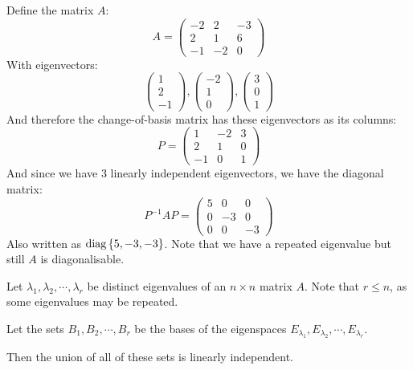 \documentclass[../Main.tex]{subfiles}
\begin{document}
\begin{example}
    Define the matrix $A$:
    \begin{equation*}
        A = 
        \begin{pmatrix}
            -2 & 2 & -3 \\
            2 & 1 & 6 \\
            -1 & -2 & 0
        \end{pmatrix}
    \end{equation*}
    With eigenvectors:
    \begin{equation*}
        \begin{pmatrix}
            1 \\ 2 \\ -1
        \end{pmatrix},
        \begin{pmatrix}
            -2 \\ 1 \\ 0
        \end{pmatrix},
        \begin{pmatrix}
            3 \\ 0 \\ 1
        \end{pmatrix}
    \end{equation*}
    And therefore the change-of-basis matrix has these eigenvectors as its columns:
    \begin{equation*}
        P = 
        \begin{pmatrix}
            1 & -2 & 3 \\
            2 & 1 & 0 \\
            -1  & 0 & 1
        \end{pmatrix}
    \end{equation*}
    And since we have 3 linearly independent eigenvectors, we have the diagonal matrix:
    \begin{equation*}
        P^{-1} A P = 
        \begin{pmatrix}
            5 & 0 & 0 \\
            0 & -3 & 0 \\
            0 & 0 & -3
        \end{pmatrix}
    \end{equation*}
    Also written as $\operatorname{diag}{\{5, -3, -3\}}$. Note that we have a repeated eigenvalue but still $A$ is diagonalisable.
\end{example}
\begin{theorem}
    Let $\lambda_1, \lambda_2, \cdots, \lambda_r$ be distinct eigenvalues of an $n \times n$ matrix $A$. Note that $r \leq n$, as some eigenvalues may be repeated.\par
    Let the sets $B_1, B_2, \cdots, B_r$ be the bases of the eigenspaces $E_{\lambda_1}, E_{\lambda_2}, \cdots, E_{\lambda_r}$.\par
    Then the union of all of these sets is linearly independent.
    \label{thmEspacesLI}
\end{theorem}
\end{document}
